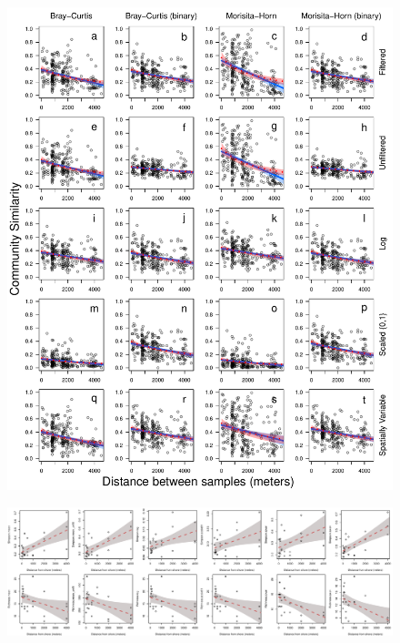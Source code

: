 \documentclass[11pt,letterpaper]{article} %
\begin{document}
\begin{figure}[H] %
  \centering
    \includegraphics[height=0.6\textheight]{distance_decay_multi.pdf}
    \caption{\protect}
  \label{distance_decay_multi}
\end{figure}

\begin{figure}[H] %
  \centering
    \includegraphics[width=1\textwidth]{diversity_distance_all.pdf}
    \caption{\protect}
  \label{diversity_distance_all}
\end{figure}
\end{document}
